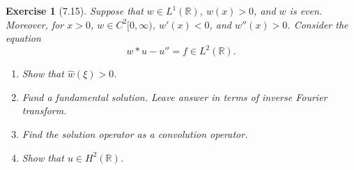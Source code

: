 \documentclass[letterpaper,twoside,11pt]{article}
\theoremstyle{mystyle}
\newtheorem*{exercise}{Exercise}
\newcommand{\R}{{\mathbb R}}
\begin{document}
\begin{exercise}[7.15]
Suppose that $w \in L^1\left( \R \right)$, $w(x) > 0$, and $w$ is even. Moreover, for $x > 0$, $w \in C^2[0, \infty)$, $w'(x) < 0$, and $w''(x) >0$. Consider the equation 
\[w\ast u - u'' = f\in L^2\left( \R \right).\]
\begin{enumerate}
  \item Show that $\hat w \left( \xi \right) >0$. 
  \item Fund a fundamental solution. Leave answer in terms of inverse Fourier transform. 
  \item Find the solution operator as a convolution operator. 
  \item Show that $u \in H^2\left( \R \right)$. 
\end{enumerate}
\end{exercise}
\end{document}
